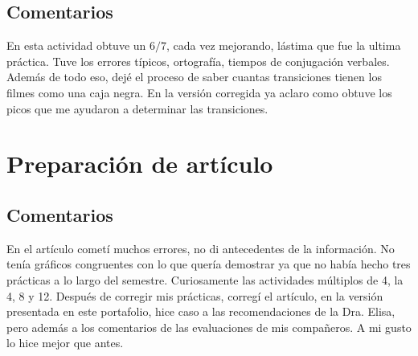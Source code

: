 \documentclass[12pt, letter]{report}
\begin{document}
\section*{Comentarios}
En esta actividad obtuve un $6/7$, cada vez mejorando, lástima que fue la ultima práctica. Tuve los errores típicos, ortografía, tiempos de conjugación verbales. Además de todo eso, dejé el proceso de saber cuantas transiciones tienen los filmes como una caja negra. En la versión corregida ya aclaro como obtuve los picos que me ayudaron a determinar las transiciones.


\chapter*{Preparación de artículo}

\section*{Comentarios}
En el artículo cometí muchos errores, no di antecedentes de la información. No tenía gráficos congruentes con lo que quería demostrar ya que no había hecho tres prácticas a lo largo del semestre. Curiosamente las actividades múltiplos de 4, la 4, 8 y 12. Después de corregir mis prácticas, corregí el artículo, en la versión presentada en este portafolio, hice caso a las recomendaciones de la Dra. Elisa, pero además a los comentarios de las evaluaciones de mis compañeros. A mi gusto lo hice mejor que antes.

\end{document}
